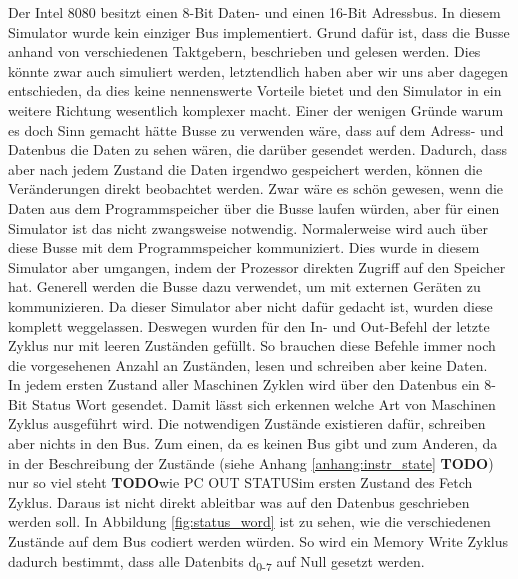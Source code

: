 \documentclass[12pt]{article}
\newcommand{\todo}{\textbf{TODO}}
\begin{document}
\noindent
Der Intel 8080 besitzt einen 8-Bit Daten- und einen 16-Bit Adressbus. 
In diesem Simulator wurde kein einziger Bus implementiert. Grund dafür ist, dass die Busse anhand von verschiedenen Taktgebern, beschrieben und gelesen werden. Dies könnte zwar auch simuliert werden, letztendlich haben aber wir uns aber dagegen entschieden, da dies keine nennenswerte Vorteile bietet und den Simulator in ein weitere Richtung wesentlich komplexer macht. Einer der wenigen Gründe warum es doch Sinn gemacht hätte Busse zu verwenden wäre, dass auf dem Adress- und Datenbus die Daten zu sehen wären, die darüber gesendet werden. Dadurch, dass aber nach jedem Zustand die Daten irgendwo gespeichert werden, können die Veränderungen direkt beobachtet werden. Zwar wäre es schön gewesen, wenn die Daten aus dem Programmspeicher über die Busse laufen würden, aber für einen Simulator ist das nicht zwangsweise notwendig. Normalerweise wird auch über diese Busse mit dem Programmspeicher kommuniziert. Dies wurde in diesem Simulator aber umgangen, indem der Prozessor direkten Zugriff auf den Speicher hat. Generell werden die Busse dazu verwendet, um mit externen Geräten zu kommunizieren. Da dieser Simulator aber nicht dafür gedacht ist, wurden diese komplett weggelassen. Deswegen wurden für den In- und Out-Befehl der letzte Zyklus nur mit leeren Zuständen gefüllt. So brauchen diese Befehle immer noch die vorgesehenen Anzahl an Zuständen, lesen und schreiben aber keine Daten.
\\

\noindent
In jedem ersten Zustand aller Maschinen Zyklen wird über den Datenbus ein 8-Bit Status Wort gesendet. Damit lässt sich erkennen welche Art von Maschinen Zyklus ausgeführt wird. 
Die notwendigen Zustände existieren dafür, schreiben aber nichts in den Bus. Zum einen, da es keinen Bus gibt und zum Anderen, da in der Beschreibung der Zustände (siehe Anhang \ref{anhang:instr_state} \textbf{TODO}) nur so viel steht \todo wie \glqq PC OUT STATUS\grqq im ersten Zustand des Fetch Zyklus. Daraus ist nicht direkt ableitbar was auf den Datenbus geschrieben werden soll. In Abbildung \ref{fig:status_word} ist zu sehen, wie die verschiedenen Zustände auf dem Bus codiert werden würden. So wird ein Memory Write Zyklus dadurch bestimmt, dass alle Datenbits d\textsubscript{0-7} auf Null gesetzt werden.
\end{document}

